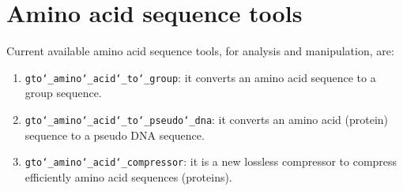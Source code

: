 \chapter{Amino acid sequence tools}
\label{seq}

Current available amino acid sequence tools, for analysis and manipulation, are:
\begin{enumerate}
	
\item \texttt{gto\char`_amino\char`_acid\char`_to\char`_group}: it converts an amino acid sequence to a group sequence.

\item \texttt{gto\char`_amino\char`_acid\char`_to\char`_pseudo\char`_dna}: it converts an amino acid (protein) sequence to a pseudo DNA sequence.

\item \texttt{gto\char`_amino\char`_acid\char`_compressor}: it is a new lossless compressor to compress efficiently amino acid sequences (proteins).

\end{enumerate}




